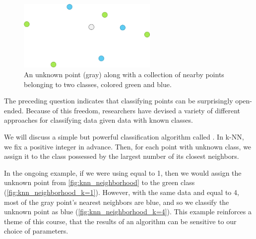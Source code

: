\begin{qbox}\end{qbox}

\begin{figure}[h]
\centering
\mySfFamily
\includegraphics[width = 0.6\textwidth]{../images/knn_neighborhood.png}
\caption{An unknown point (gray) along with a collection of nearby points belonging to two classes, colored green and blue.}
\label{fig:knn_neighborhood}
\end{figure}

The preceding question indicates that classifying points can be surprisingly open-ended. Because of this freedom, researchers have devised a variety of different approaches for classifying data given data with known classes.

We will discuss a simple but powerful classification algorithm called . In k-NN, we fix a positive integer  in advance. Then, for each point with unknown class, we assign it to the class possessed by the largest number of its  closest neighbors.

In the ongoing example, if we were using  equal to 1, then we would assign the unknown point from \autoref{fig:knn_neighborhood} to the green class (\autoref{fig:knn_neighborhood_k=1}). However, with the same data and  equal to 4, most of the gray point's  nearest neighbors are blue, and so we classify the unknown point as blue (\autoref{fig:knn_neighborhood_k=4}). This example reinforces a theme of this course, that the results of an algorithm can be sensitive to our choice of parameters.\\

